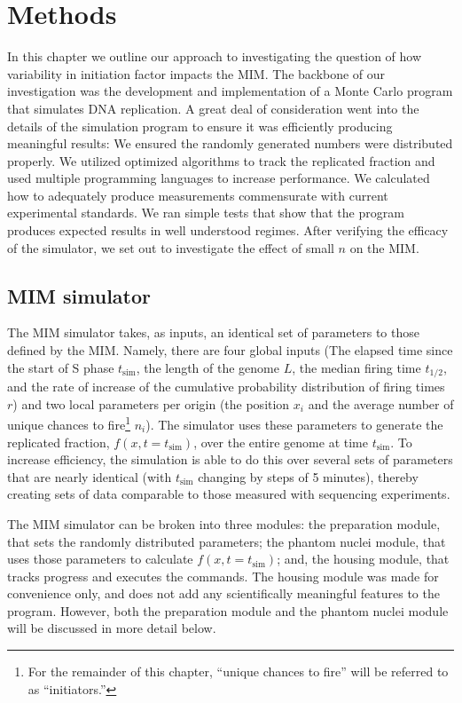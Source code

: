 \chapter{Methods}
\label{ch:Methods}

In this chapter we outline our approach to investigating the question of how variability in initiation factor impacts the MIM.
The backbone of our investigation was the development and implementation of a Monte Carlo program that simulates DNA replication.
A great deal of consideration went into the details of the simulation program to ensure it was efficiently producing meaningful results:
We ensured the randomly generated numbers were distributed properly.
We utilized optimized algorithms to track the replicated fraction and used multiple programming languages to increase performance.
We calculated how to adequately produce measurements commensurate with current experimental standards.
We ran simple tests that show that the program produces expected results in well understood regimes.
After verifying the efficacy of the simulator, we set out to investigate the effect of small $n$ on the MIM.


	\section{MIM simulator}
	
	The MIM simulator takes, as inputs, an identical set of parameters to those defined by the MIM.
	Namely, there are four global inputs (The elapsed time since the start of S phase $t_\text{sim}$, the length of the genome $L$, the median firing time $t_{1/2}$, and the rate of increase of the cumulative probability distribution of firing times $r$) and two local parameters per origin (the position $x_i$ and the average number of unique chances to fire\footnote{For the remainder of this chapter, ``unique chances to fire'' will be referred to as ``initiators.''} $n_i$).
	The simulator uses these parameters to generate the replicated fraction, $f(x,t=t_\text{sim})$, over the entire genome at time $t_\text{sim}$.
	To increase efficiency, the simulation is able to do this over several sets of parameters that are nearly identical (with $t_\text{sim}$ changing by steps of 5 minutes), thereby creating sets of data comparable to those measured with sequencing experiments.
	
	The MIM simulator can be broken into three modules: the preparation module, that sets the randomly distributed parameters; the phantom nuclei module, that uses those parameters to calculate $f(x,t=t_\text{sim})$; and, the housing module, that tracks progress and executes the commands.
	The housing module was made for convenience only, and does not add any scientifically meaningful features to the program.
	However, both the preparation module and the phantom nuclei module will be discussed in more detail below.
	
